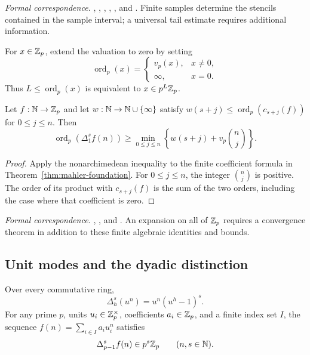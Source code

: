 \begingroup\small\raggedright
\noindent\emph{Formal correspondence.}
,
,
,
,
, and
.
Finite samples determine the stencils contained in the sample interval;
a universal tail estimate requires additional information.
\par\endgroup

For $x\in\mathbb Z_p$, extend the valuation to zero by setting
\[
\operatorname{ord}_p(x)=
\begin{cases}v_p(x),&x\ne0,\\\infty,&x=0.\end{cases}
\]
Thus $L\leq\operatorname{ord}_p(x)$ is equivalent to $x\in p^L\mathbb Z_p$.

\begin{theorem}
\label{thm:weighted-mahler-foundation}
Let $f:\mathbb N\to\mathbb Z_p$ and let $w:\mathbb N\to\mathbb N\cup\{\infty\}$ satisfy
$w(s+j)\leq\operatorname{ord}_p(c_{s+j}(f))$ for $0\leq j\leq n$.
Then
\[
\operatorname{ord}_p(\Delta_1^s f(n))\geq
\min_{0\leq j\leq n}
\left\{w(s+j)+v_p\binom nj\right\}.
\]
\end{theorem}

\begin{proof}
Apply the nonarchimedean inequality to the finite coefficient formula in
Theorem~\ref{thm:mahler-foundation}. For $0\leq j\leq n$, the integer
$\binom nj$ is positive. The order of its product with $c_{s+j}(f)$ is the
sum of the two orders, including the case where that coefficient is zero.
\end{proof}

\begingroup\small\raggedright
\noindent\emph{Formal correspondence.}
,
, and
.
An expansion on all of $\mathbb Z_p$ requires a convergence theorem in addition to
these finite algebraic identities and bounds.
\par\endgroup

\subsection{Unit modes and the dyadic distinction}

\begin{theorem}
\label{thm:unit-modes-foundation}
Over every commutative ring,
\[
\Delta_h^s(u^n)=u^n(u^h-1)^s.
\]
For any prime $p$, units $u_i\in\mathbb Z_p^\times$, coefficients $a_i\in\mathbb Z_p$, and
a finite index set $I$, the sequence $f(n)=\sum_{i\in I}a_i u_i^n$ satisfies
\[
\Delta_{p-1}^s f(n)\in p^s\mathbb Z_p
\qquad(n,s\in\mathbb N).
\]
\end{theorem}

